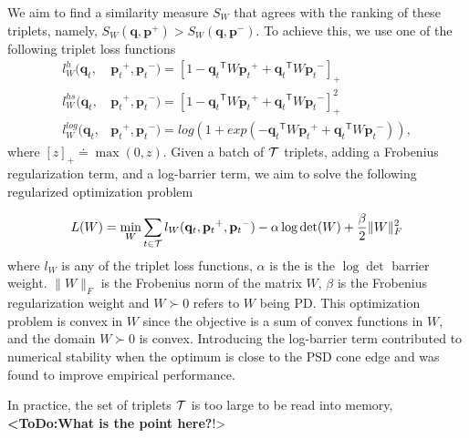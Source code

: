 \documentclass[twoside,11pt]{article}
\newcommand\todo[1]{\textbf{<ToDo:#1}!>}
\newcommand\mat[1]{{#1}}
\renewcommand\vec[1]{\mathbf{#1}}
\newcommand{\T}{{}^\mathsf{T}}
\newcommand{\W}{\mat{W}}
\newcommand{\eqdef}{\doteq}
\newcommand{\frobsq}[1]{{\|#1\|_F^2}}
\newcommand{\frob}[1]{{\|#1\|_F}}
\newcommand{\ignore}[1]{}
\newcommand{\q}{{\vec{q}}}
\newcommand{\p}{{\vec{p}}}
\newcommand{\trip}{{t}}
\newcommand{\qt}{{\q_{\trip}}}
\newcommand{\pt}{{\p_{\trip}}}
\begin{document}
We aim to find a similarity measure $S_{\W}$ that agrees with the ranking of these triplets, namely, $S_{\W}(\q, \p^{+}) > S_{\W}(\q,
\p^{-})$. To achieve this, we use one of the following triplet loss functions
\begin{align}
\label{single-triplet-lossed}
l_{\W}^h(\qt, &\pt^{+}, \pt^{-}) = [1-\qt\T\W\pt^+ + \qt\T\W\pt^-]_{+}
 \\ \nonumber
l_{\W}^{hs}(\qt, &\pt^+, \pt^-) = [1-\qt\T\W\pt^+ + \qt\T\W\pt^-]_{+}^2
 \\ \nonumber
l_{\W}^{log}(\qt, &\pt^+, \pt^-) = log(1+exp(-\qt\T\W\pt^+ + \qt\T\W\pt^-)) \nonumber ,
\end{align}
where $[z]_{+} \eqdef \max(0,z)$. Given a batch of $\cal{T}$ triplets, adding a Frobenius regularization term, and a log-barrier term, we aim to solve the following regularized optimization problem

\begin{equation}
\label{eq-logdet-loss}
L(W) = 
  \min_{\W} \sum_{\trip \in \cal{T}}  l_{\W}(\qt, \pt^+, \pt^-) - \alpha \log \det(\W) + \frac{\beta}{2} \frobsq{\W}
\end{equation}
where $l_{\W}$ is any of the triplet loss functions, $\alpha$ is the is the $\log\det$ barrier weight. $\frob{\W}$ is the Frobenius norm of the matrix $\W$, $\beta$ is the Frobenius regularization weight and $\W \succ 0$ refers to $\W$ being PD. This optimization problem is convex in $\W$ since the objective is a sum of convex functions in $\W$, and the domain $\W \succ 0$ is convex.
Introducing the log-barrier term contributed to numerical stability when the optimum is close to the PSD cone edge and was found to improve empirical performance.


\ignore{
\begin{eqnarray}
  \min_{\W}& \sum_{\trip=1}^{\cal{T}}  l_{\W}(\qt, \pt^+, \pt^-) + \frac{\beta}{2} \frobsq{\W}
 \\  \nonumber
   \rm{s.t.}& \W \succ 0 \quad,
\label{hingelt}
\end{eqnarray}
}

In practice, the set of triplets $\cal{T}$ is too large to be read into memory, \todo{What is the point here?}

\ignore{
Previous metric learning approaches \citep{OASIS, qianHD, qian}, solved the constrained optimization problem by SGD or stochastic mini-batch gradient steps, while repeatedly projecting back to the convex cone of PD matrices. This projection amounts to solving an eigendecomposition problem and is therefore costly in runtime. An alternative approach is to use a log-barrier term and avoid projecting onto the PD cone \citep{davis2007information,lego}, yielding}
\end{document}
